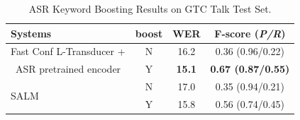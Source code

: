 \documentclass{article}
\begin{document}
\begin{table}[]
\caption{\label{tab:exp-wb-asr} {ASR Keyword Boosting Results on GTC Talk Test Set.} }
\begin{tabular}{lccc}
\toprule
Systems                               & boost  & WER   & F-score  ({\em P/R})  \\
\midrule
 \midrule                                    
Fast Conf L-Transducer +    & N             & 16.2 & 0.36 (0.96/0.22)      \\
              \ ASR pretrained encoder                         & Y             & \textbf{15.1} & \textbf{0.67 (0.87/0.55)}      \\
                                      \midrule
\multirow{2}{*}{SALM} & N             & 17.0  & 0.35 (0.94/0.21)      \\
                                & Y             & 15.8  & 0.56 (0.74/0.45)     \\

\end{tabular}
\end{table}
\end{document}
